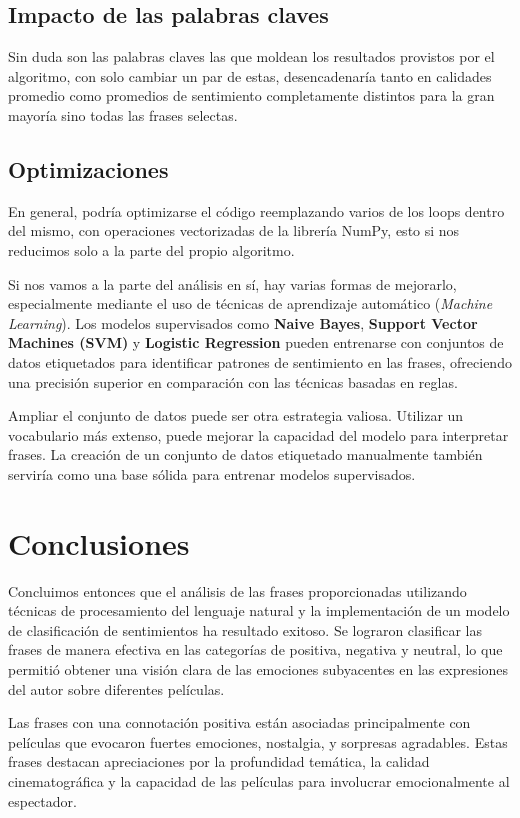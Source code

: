 \documentclass{article}
\begin{document}
    \subsection{Impacto de las palabras claves}
    Sin duda son las palabras claves las que moldean los resultados provistos por el algoritmo, con solo cambiar un par de estas, desencadenaría tanto en calidades promedio como promedios de sentimiento completamente distintos para la gran mayoría sino todas las frases selectas.

    \subsection{Optimizaciones}
    En general, podría optimizarse el código reemplazando varios de los loops dentro del mismo, con operaciones vectorizadas de la librería NumPy, esto si nos reducimos solo a la parte del propio algoritmo.

    Si nos vamos a la parte del análisis en sí, hay varias formas de mejorarlo, especialmente mediante el uso de técnicas de aprendizaje automático (\textit{Machine Learning}). Los modelos supervisados como \textbf{Naive Bayes}, \textbf{Support Vector Machines (SVM)} y \textbf{Logistic Regression} pueden entrenarse con conjuntos de datos etiquetados para identificar patrones de sentimiento en las frases, ofreciendo una precisión superior en comparación con las técnicas basadas en reglas.

    Ampliar el conjunto de datos puede ser otra estrategia valiosa. Utilizar un vocabulario más extenso, puede mejorar la capacidad del modelo para interpretar frases. La creación de un conjunto de datos etiquetado manualmente también serviría como una base sólida para entrenar modelos supervisados.

    \section{Conclusiones}
    Concluimos entonces que el análisis de las frases proporcionadas utilizando técnicas de procesamiento del lenguaje natural y la implementación de un modelo de clasificación de sentimientos ha resultado exitoso. Se lograron clasificar las frases de manera efectiva en las categorías de positiva, negativa y neutral, lo que permitió obtener una visión clara de las emociones subyacentes en las expresiones del autor sobre diferentes películas.

    Las frases con una connotación positiva están asociadas principalmente con películas que evocaron fuertes emociones, nostalgia, y sorpresas agradables. Estas frases destacan apreciaciones por la profundidad temática, la calidad cinematográfica y la capacidad de las películas para involucrar emocionalmente al espectador.
\end{document}

